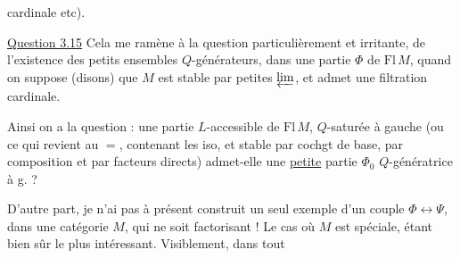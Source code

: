cardinale etc).

\uline{Question 3.15} Cela me ramène à la question particulièrement  et irritante, de l’existence des petits ensembles $Q$-générateurs, dans une partie $\Phi$ de $\mathrm{Fl}\,M$, quand on suppose (disons) que $M$ est stable par petites $\varprojlim$,  et  admet une filtration cardinale.

Ainsi on a la question : une partie $L$-accessible de $\mathrm{Fl}\,M$,  $Q$-saturée  à gauche (ou ce qui revient au $=$, contenant les iso, et stable par cochgt de base, par composition et par facteurs directs) admet-elle une \uline{petite} partie $\Phi_0$ $Q$-génératrice à g. ?

{\reversemarginpar\margin{!\hfill\rule[-3em]{.4pt}{6em}}}
D’autre part, je n’ai pas à présent construit un seul exemple d’un couple $\Phi\longleftrightarrow\Psi$, dans une catégorie $M$, qui ne soit factorisant ! Le cas où $M$ est spéciale, étant bien sûr le plus intéressant. Visiblement, dans tout
